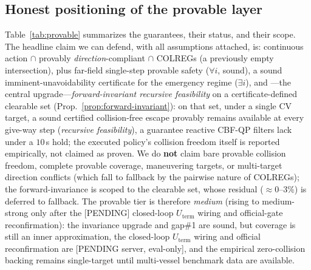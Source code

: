 \subsection{Honest positioning of the provable layer}
\label{sec:provable-summary}

Table~\ref{tab:provable} summarizes the guarantees, their status, and their scope.
The headline claim we can defend, with all assumptions attached, is: continuous
action $\cap$ provably \emph{direction}-compliant $\cap$ COLREGs (a previously empty
intersection), plus far-field single-step provable safety ($\forall i$, sound), a
sound imminent-unavoidability certificate for the emergency regime ($\exists i$), and
---the central upgrade---\emph{forward-invariant recursive feasibility} on a
certificate-defined clearable set (Prop.~\ref{prop:forward-invariant}): on that set,
under a single CV target, a sound certified collision-free escape provably remains
available at every give-way step (\emph{recursive feasibility}), a guarantee reactive
CBF-QP filters lack under a $10$\,s hold; the executed policy's collision freedom itself
is reported empirically, not claimed as proven. We do \textbf{not} claim
bare provable collision freedom, complete provable coverage, maneuvering targets, or
multi-target direction conflicts (which fall to fallback by the pairwise nature of
COLREGs); the forward-invariance is scoped to the clearable set, whose residual
($\approx\!0$--$3\%$) is deferred to fallback. The provable tier is therefore
\emph{medium} (rising to medium-strong only after the [PENDING] closed-loop
$U_{\mathrm{term}}$ wiring and official-gate reconfirmation): the invariance upgrade and
gap\#1 are sound, but coverage is
still an inner approximation, the closed-loop $U_{\mathrm{term}}$ wiring and official
reconfirmation are [PENDING server, eval-only], and the empirical zero-collision
backing remains single-target until multi-vessel benchmark data are available.

